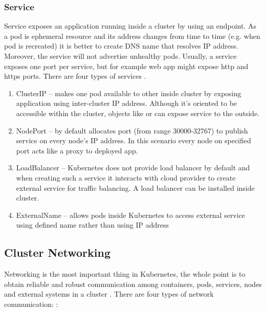\subsubsection{Service}
\label{svc}

Service exposes an application running inside a cluster by using an endpoint. As a pod is ephemeral resource and its address changes from time to time (e.g. when pod is recreated) it is better to create DNS name that resolves IP address. Moreover, the service will not advertise unhealthy pods. Usually, a service exposes one port per service, but for example web app might expose http and https ports. There are four types of services \cite{KubernetesService}. 


\begin{enumerate}
    \item ClusterIP -- makes one pod available to other inside cluster by exposing application using inter-cluster IP address. Although it's oriented to be accessible within the cluster, objects like \textit{} or \textit{} can expose service to the outside.
    \item NodePort -- by default allocates port (from range 30000-32767) to publish service on every node's IP address. In this scenario every node on specified port acts like a proxy to deployed app.
    \item LoadBalancer -- Kubernetes does not provide load balancer by default and when creating such a service it interacts with cloud provider to create external service for traffic balancing. A load balancer can be installed inside cluster.
    \item ExternalName -- allows pods inside Kubernetes to access external service using defined name rather than using IP address 
\end{enumerate}




\subsection{Cluster Networking}
\label{sec:k8s_networking}

Networking is the most important thing in Kubernetes, the whole point is to obtain reliable and robust communication among containers, pods, services, nodes and external systems in a cluster \cite{KubernetesClusterNetworking}. There are four types of network communication: \cite{KubernetesClusterNetworking}:

